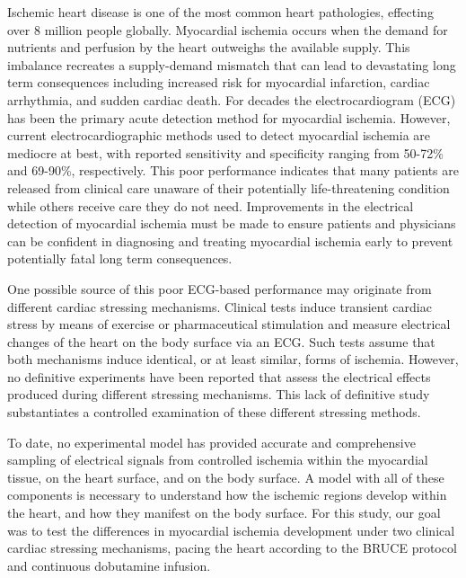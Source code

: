 \documentclass[twocolumn]{cinc}
\begin{document}
Ischemic heart disease is one of the most common heart pathologies,
effecting over 8 million people globally. \cite{Roth2015} Myocardial
ischemia occurs when the demand for nutrients and perfusion by the heart
outweighs the available supply. This imbalance recreates a supply-demand
mismatch that can lead to devastating long term consequences including
increased risk for myocardial infarction, cardiac arrhythmia, and sudden
cardiac death.\cite{Roth2015} For decades the electrocardiogram (ECG) has
been the primary acute detection method for myocardial
ischemia. \cite{McCarthy1990} However, current electrocardiographic
methods used to detect myocardial ischemia are mediocre at best, with
reported sensitivity and specificity ranging from 50-72\% and 69-90\%,
respectively. \cite{Akkerhuis2011} This poor performance indicates
that many patients are released from clinical care unaware of their
potentially life-threatening condition while others receive care they do
not need. Improvements in the electrical detection of myocardial ischemia
must be made to ensure patients and physicians can be confident in
diagnosing and treating myocardial ischemia early to prevent potentially
fatal long term consequences.

One possible source of this poor ECG-based performance may originate
from different cardiac stressing mechanisms. Clinical tests induce
transient cardiac stress by means of exercise or pharmaceutical stimulation
and measure electrical changes of the heart on the body surface via an
ECG. Such tests assume that both mechanisms induce identical, or at least
similar, forms of ischemia. However, no definitive experiments have been
reported that assess the electrical effects produced during
different stressing mechanisms. This lack of definitive study 
substantiates a controlled examination of these different stressing methods.

To date, no experimental model has provided accurate and comprehensive sampling of
electrical signals from controlled ischemia within the myocardial
tissue, on the heart surface, and on the body surface. A model with all of these
components is necessary to understand how the ischemic regions develop
within the heart, and how they manifest on the body surface. For this
study, our goal was to test the differences in myocardial ischemia
development under two
clinical cardiac stressing mechanisms, pacing the heart according to the BRUCE protocol and continuous
dobutamine infusion.


%
\end{document}
